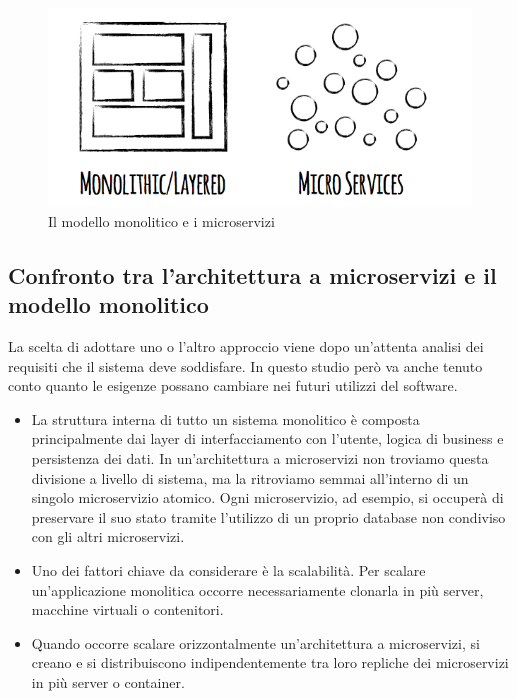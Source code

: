 \begin{figure}[h!]
	\centering
	\includegraphics[width=\textwidth,keepaspectratio=true]{capitoli/imgs/disegnoMicrosMonol.png}
	\caption{Il modello monolitico e i microservizi}
\end{figure}

\subsection{Confronto tra l'architettura a microservizi e il modello monolitico}
La scelta di adottare uno o l'altro approccio viene dopo un'attenta analisi dei requisiti che il sistema deve soddisfare. In questo studio però va anche tenuto conto quanto le esigenze possano cambiare nei futuri utilizzi del software.
\begin{itemize}
	\item La struttura interna di tutto un sistema monolitico è composta principalmente dai layer di interfacciamento con l'utente, logica di business e persistenza dei dati. In un'architettura a microservizi non troviamo questa divisione a livello di sistema, ma la ritroviamo semmai all'interno di un singolo microservizio atomico. Ogni microservizio, ad esempio, si occuperà di preservare il suo stato tramite l'utilizzo di un proprio database non condiviso con gli altri microservizi. 
	
	\item Uno dei fattori chiave da considerare è la scalabilità. Per scalare un'applicazione monolitica occorre necessariamente clonarla in più server, macchine virtuali o contenitori.
	
	\item Quando occorre scalare orizzontalmente un'architettura a microservizi, si creano e si distribuiscono indipendentemente tra loro repliche dei microservizi in più server o container. 
\end{itemize}



